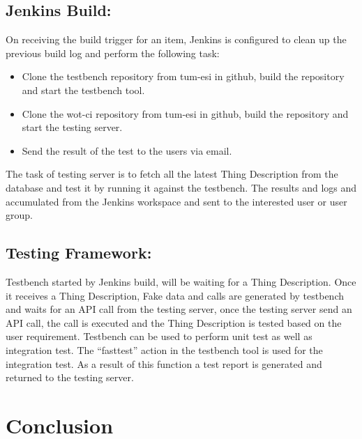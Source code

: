 \documentclass[conference]{IEEEtran}
\theoremstyle{definition}
\begin{document}
\subsection{Jenkins Build:}
  
On receiving the build trigger for an item, Jenkins is configured to clean up the previous build log and perform the following task:

\begin{itemize}
\item Clone the testbench repository from tum-esi in github, build the repository and start the testbench tool.
\item Clone the wot-ci repository from tum-esi in github, build the repository and start the testing server.
\item Send the result of the test to the users via email.
\end{itemize}

The task of testing server is to fetch all the latest Thing Description from the database and test it by running it against the testbench.
The results and logs and accumulated from the Jenkins workspace and sent to the interested user or user group.

\subsection{Testing Framework:}

Testbench started by Jenkins build, will be waiting for a Thing Description. 
Once it receives a Thing Description, Fake data and calls are generated by testbench and waits for an API call from the testing server, once the testing server send an API call, the call is executed and the Thing Description is tested based on the user requirement.
Testbench can be used to perform unit test as well as integration test. 
The “fasttest” action in the testbench tool is used for the integration test. 
As a result of this function a test report is generated and returned to the testing server.

\section{Conclusion}
\end{document}
